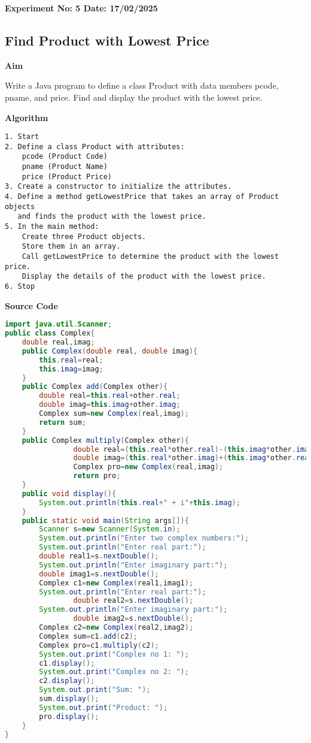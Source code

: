 \textbf{Experiment No: 5 \hfill Date: 17/02/2025}

\begin{center}
    \Large \subsection*{Find Product with Lowest Price}
\end{center}

\textbf{Aim}
\vspace{0.5cm}

Write a Java program to define a class Product with data members pcode, pname, and price. Find and display the product with the lowest price.

\vspace{0.5cm}
\textbf{Algorithm}
\vspace{0.5cm}
\begin{verbatim}
1. Start
2. Define a class Product with attributes:
    pcode (Product Code)
    pname (Product Name)
    price (Product Price)
3. Create a constructor to initialize the attributes.
4. Define a method getLowestPrice that takes an array of Product objects 
   and finds the product with the lowest price.
5. In the main method:
    Create three Product objects.
    Store them in an array.
    Call getLowestPrice to determine the product with the lowest price.
    Display the details of the product with the lowest price.
6. Stop
\end{verbatim}

\vspace{0.5cm}
\textbf{Source Code}
\begin{lstlisting}[language=Java]
import java.util.Scanner;
public class Complex{
	double real,imag;
	public Complex(double real, double imag){
		this.real=real;
		this.imag=imag;
	}
	public Complex add(Complex other){
		double real=this.real+other.real;
		double imag=this.imag+other.imag;
		Complex sum=new Complex(real,imag);
		return sum;
	}
	public Complex multiply(Complex other){
                double real=(this.real*other.real)-(this.imag*other.imag);
                double imag=(this.real*other.imag)+(this.imag*other.real);
                Complex pro=new Complex(real,imag);
                return pro;
	}
	public void display(){
		System.out.println(this.real+" + i"+this.imag);
	}
	public static void main(String args[]){
		Scanner s=new Scanner(System.in);
		System.out.println("Enter two complex numbers:");
		System.out.println("Enter real part:");
		double real1=s.nextDouble();
		System.out.println("Enter imaginary part:");
		double imag1=s.nextDouble();
		Complex c1=new Complex(real1,imag1);
		System.out.println("Enter real part:");
                double real2=s.nextDouble();
		System.out.println("Enter imaginary part:");
                double imag2=s.nextDouble();
		Complex c2=new Complex(real2,imag2);
		Complex sum=c1.add(c2);
		Complex pro=c1.multiply(c2);
		System.out.print("Complex no 1: ");
		c1.display();
		System.out.print("Complex no 2: ");
		c2.display();
		System.out.print("Sum: ");
		sum.display();
		System.out.print("Product: ");
		pro.display();
	}
}
\end{lstlisting}


